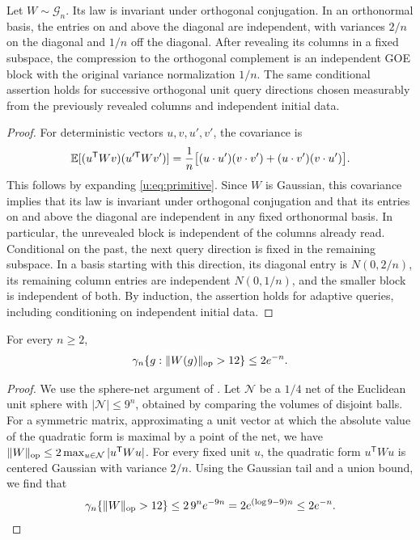 \begin{lemma}\label{u:lem:goe-conditioning}
Let $W\sim\mathcal G_n$. Its law is invariant under orthogonal
conjugation. In an orthonormal basis, the entries on and above the
diagonal are independent, with variances $2/n$ on the diagonal and
$1/n$ off the diagonal. After revealing its columns in a fixed
subspace, the compression to the orthogonal complement is an
independent GOE block with the original variance normalization $1/n$.
The same conditional assertion holds for successive orthogonal unit
query directions chosen measurably from the previously revealed columns
and independent initial data.
\end{lemma}

\begin{proof}
For deterministic vectors $u,v,u',v'$, the covariance is
\[
 \mathbb E[(u^{\mathsf T}Wv)(u'^{\mathsf T}Wv')]
 =\frac1n\bigl[(u\cdot u')(v\cdot v')
                 +(u\cdot v')(v\cdot u')\bigr].
\]
This follows by expanding \eqref{u:eq:primitive}. Since $W$ is
Gaussian, this covariance implies that its law is invariant under
orthogonal conjugation and that its entries on and above the diagonal
are independent in any fixed orthonormal basis. In particular, the unrevealed block is independent
of the columns already read. Conditional on the past, the next query
direction is fixed in the remaining subspace. In a basis starting
with this direction, its diagonal entry is $N(0,2/n)$, its remaining
column entries are independent $N(0,1/n)$, and the smaller block is
independent of both. By induction, the assertion holds for
adaptive queries, including conditioning on independent initial data.
\end{proof}

\begin{lemma}\label{u:lem:goe-norm}
For every $n\ge2$,
\begin{equation}\label{u:eq:goe-norm}
 \gamma_n\{g:\lVert W(g)\rVert_{\mathrm{op}}>12\}\le2e^{-n}.
\end{equation}
\end{lemma}

\begin{proof}
We use the sphere-net argument of
\cite[Corollary~4.2.13 and Exercise~4.4.3(b)]{vershynin-2018}.
Let $\mathcal N$ be a $1/4$ net of the Euclidean unit sphere with
$|\mathcal N|\le9^n$, obtained by comparing the volumes of disjoint
balls. For a symmetric matrix, approximating a unit vector at which
the absolute value of the quadratic form is maximal by a point of the
net, we have
$\lVert W\rVert_{\mathrm{op}}\le2\max_{u\in\mathcal N}|u^{\mathsf T}Wu|$.
For every fixed unit $u$, the quadratic form $u^{\mathsf T}Wu$ is
centered Gaussian with variance $2/n$. Using the Gaussian tail and a
union bound, we find that
\[
 \gamma_n\{\lVert W\rVert_{\mathrm{op}}>12\}
 \le2\,9^n e^{-9n}
 =2e^{(\log9-9)n}\le2e^{-n}.
\]
\end{proof}

